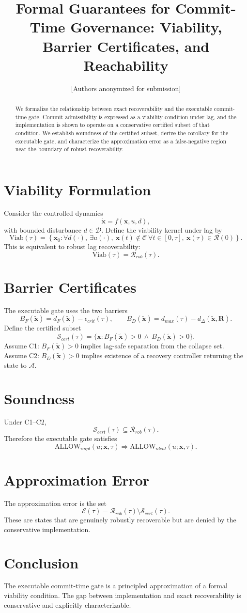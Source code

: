 \documentclass[letterpaper,10pt,conference]{ieeeconf}
\title{\bf Formal Guarantees for Commit-Time Governance: Viability, Barrier Certificates, and Reachability}
\author{[Authors anonymized for submission]}
\newcommand{\x}{\mathbf{x}}
\newcommand{\xt}{\tilde{\mathbf{x}}}
\newcommand{\A}{\mathcal{A}}
\newcommand{\Rset}{\mathcal{R}}
\newcommand{\Rrob}{\mathcal{R}_{rob}}
\newcommand{\Cset}{\mathcal{C}}
\newcommand{\Scert}{\mathcal{S}_{cert}}
\newcommand{\Rigel}{\mathbf{R}}
\begin{document}
\maketitle
\thispagestyle{empty}
\pagestyle{empty}
\begin{abstract}
We formalize the relationship between exact recoverability and the executable commit-time gate. Commit admissibility is expressed as a viability condition under lag, and the implementation is shown to operate on a conservative certified subset of that condition. We establish soundness of the certified subset, derive the corollary for the executable gate, and characterize the approximation error as a false-negative region near the boundary of robust recoverability.
\end{abstract}
\section{Viability Formulation}
Consider the controlled dynamics
\[
\dot{\x}=f(\x,u,d),
\]
with bounded disturbance $d\in\mathcal{D}$.
Define the viability kernel under lag by
\[
\mathrm{Viab}(\tau)=\left\{\x_0:
\forall d(\cdot),\ \exists u(\cdot),\ 
\x(t)\notin\Cset\ \forall t\in[0,\tau],\ 
\x(\tau)\in\Rset(0)\right\}.
\]
This is equivalent to robust lag recoverability:
\[
\mathrm{Viab}(\tau)=\Rrob(\tau).
\]
\section{Barrier Certificates}
The executable gate uses the two barriers
\[
B_F(\xt)=d_F(\xt)-\epsilon_{crit}(\tau),\qquad
B_D(\xt)=d_{max}(\tau)-d_\Delta(\xt,\Rigel).
\]
Define the certified subset
\[
\Scert(\tau)=\{\x: B_F(\xt)>0\ \wedge\ B_D(\xt)>0\}.
\]
Assume C1: $B_F(\xt)>0$ implies lag-safe separation from the collapse set. Assume C2: $B_D(\xt)>0$ implies existence of a recovery controller returning the state to $\A$.
\section{Soundness}
Under C1--C2,
\[
\Scert(\tau)\subseteq \Rrob(\tau).
\]
Therefore the executable gate satisfies
\[
\mathrm{ALLOW}_{impl}(u;\x,\tau)\Rightarrow \mathrm{ALLOW}_{ideal}(u;\x,\tau).
\]
\section{Approximation Error}
The approximation error is the set
\[
\mathcal{E}(\tau)=\Rrob(\tau)\setminus\Scert(\tau).
\]
These are states that are genuinely robustly recoverable but are denied by the conservative implementation.
\section{Conclusion}
The executable commit-time gate is a principled approximation of a formal viability condition. The gap between implementation and exact recoverability is conservative and explicitly characterizable.
\end{document}
